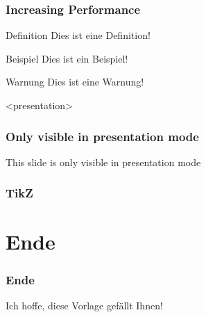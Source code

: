 \documentclass[9pt]{beamer}
\begin{document}
\begin{frame}
\frametitle<presentation>{Increasing Performance}
\begin{block}{Definition}
Dies ist eine Definition!
\end{block}
\begin{exampleblock}{Beispiel}
Dies ist ein Beispiel!
\end{exampleblock}
\begin{alertblock}{Warnung}
Dies ist eine Warnung!
\end{alertblock}
\end{frame}

\begin{frame}<presentation>
\frametitle{Only visible in presentation mode}
This slide is only visible in presentation mode
\end{frame}


\begin{frame}
\frametitle<presentation>{TikZ}
\begin{center}
\end{center}
\end{frame}

\section{Ende}

\begin{frame}
\frametitle<presentation>{Ende}
Ich hoffe, diese Vorlage gefällt Ihnen!
\end{frame}



\end{document}
